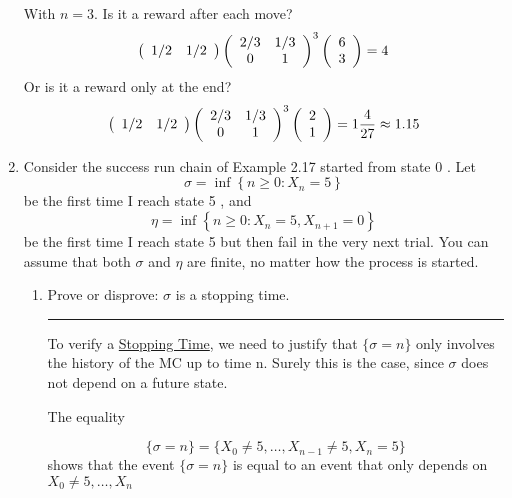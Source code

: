 \documentclass{article} %
\theoremstyle{plain}
\theoremstyle{case}
\begin{document}
\begin{enumerate}[label={\fbox{\textbf{Exercise \#\arabic* :}}}]
With $n=3$.  Is it a reward after each move?
  \[
      \left(
      \begin{array}{cc}
        1/2 & 1/2 \\
      \end{array}
     \right)
%
      \left(
        \begin{array}{c c}
          2/3 & 1/3 \\
          0   & 1 
        \end{array}
      \right)^3
%
      \left(
        \begin{array}{c}
        6 \\
        3 
        \end{array}
      \right) = 4
\]
Or is it a reward only at the end?
  \[
      \left(
      \begin{array}{cc}
        1/2 & 1/2 \\
      \end{array}
     \right)
%
      \left(
        \begin{array}{c c}
          2/3 & 1/3 \\
          0   & 1 
        \end{array}
      \right)^3
      \left(
        \begin{array}{c}
        2 \\
        1 
        \end{array}
      \right) = 1 \frac{4}{27} \approx 1.15
      \]

\newpage

  \item Consider the success run chain of Example 2.17 started from state 0 . Let
$$
\sigma=\inf \left\{n \geq 0: X_n=5\right\}
$$
be the first time I reach state 5 , and
$$
\eta=\inf \left\{n \geq 0: X_n=5, X_{n+1}=0\right\}
$$
be the first time I reach state 5 but then fail in the very next trial. You can assume that both $\sigma$ and $\eta$ are finite, no matter how the process is started.
  \begin{enumerate}
	\item  Prove or disprove: $\sigma$ is a stopping time.
\par\noindent\rule{\textwidth}{0.1pt}

     To verify a \underline{Stopping Time},  we need to justify that
     $\{\sigma=n\}$ only involves the history of the MC up to time n.
     Surely this is the case, since $\sigma$ does not depend on
     a future state.

     The equality

     \[ \{ \sigma = n \} = \{X_0 \neq 5, \dots, X_{n-1} \neq 5, X_n=5 \} \]
     shows that the event $\{\sigma = n\}$ is equal to an event that 
     only depends on $X_0 \neq 5, \dots, X_{n} $


\end{enumerate}
\end{enumerate}
\end{document}
